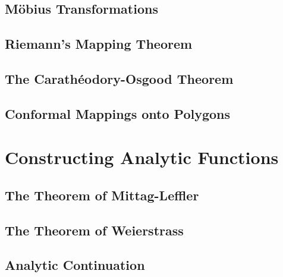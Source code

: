 \documentclass[11pt, a4paper, latinreim, shortsets]{notes}
\begin{document}
\begin{enumerate}[label={\bfseries II.5.\arabic*}]
\section{M\"obius Transformations}
\section{Riemann's Mapping Theorem}
\section{The Carath\'eodory-Osgood Theorem}
\section{Conformal Mappings onto Polygons}

\chapter{Constructing Analytic Functions}
\section{The Theorem of Mittag-Leffler}
\section{The Theorem of Weierstrass}
\section{Analytic Continuation}

\end{enumerate}
\end{document}
